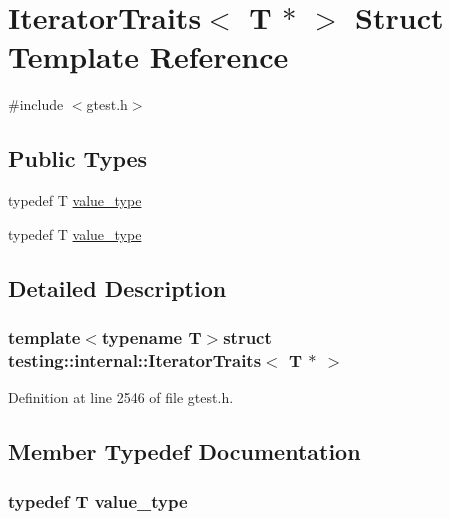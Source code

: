 \hypertarget{structtesting_1_1internal_1_1IteratorTraits_3_01T_01_5_01_4}{\section{\-Iterator\-Traits$<$ \-T $\ast$ $>$ \-Struct \-Template \-Reference}
\label{d9/d76/structtesting_1_1internal_1_1IteratorTraits_3_01T_01_5_01_4}
}


{\ttfamily \#include $<$gtest.\-h$>$}

\subsection*{\-Public \-Types}
\begin{DoxyCompactItemize}
\item 
typedef \-T \hyperlink{structtesting_1_1internal_1_1IteratorTraits_3_01T_01_5_01_4_a265a253612b46abed17c61b0a5e5ce30}{value\-\_\-type}
\item 
typedef \-T \hyperlink{structtesting_1_1internal_1_1IteratorTraits_3_01T_01_5_01_4_a265a253612b46abed17c61b0a5e5ce30}{value\-\_\-type}
\end{DoxyCompactItemize}


\subsection{\-Detailed \-Description}
\subsubsection*{template$<$typename T$>$struct testing\-::internal\-::\-Iterator\-Traits$<$ T $\ast$ $>$}



\-Definition at line 2546 of file gtest.\-h.



\subsection{\-Member \-Typedef \-Documentation}
\hypertarget{structtesting_1_1internal_1_1IteratorTraits_3_01T_01_5_01_4_a265a253612b46abed17c61b0a5e5ce30}{
\subsubsection[{value\-\_\-type}]{\setlength{\rightskip}{0pt plus 5cm}typedef \-T {\bf value\-\_\-type}}}\label{d9/d76/structtesting_1_1internal_1_1IteratorTraits_3_01T_01_5_01_4_a265a253612b46abed17c61b0a5e5ce30}


